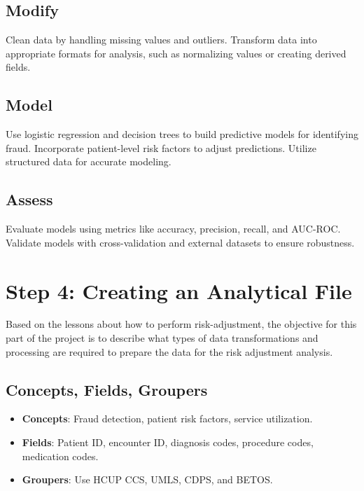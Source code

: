 \documentclass{article}
\begin{document}
\subsection*{Modify}
Clean data by handling missing values and outliers. Transform data into appropriate formats for analysis, such as normalizing values or creating derived fields.

\subsection*{Model}
Use logistic regression and decision trees to build predictive models for identifying fraud. Incorporate patient-level risk factors to adjust predictions. Utilize structured data for accurate modeling.

\subsection*{Assess}
Evaluate models using metrics like accuracy, precision, recall, and AUC-ROC. Validate models with cross-validation and external datasets to ensure robustness.

\section*{Step 4: Creating an Analytical File}

Based on the lessons about how to perform risk-adjustment, the objective for this part of the project is to describe what types of data transformations and processing are required to prepare the data for the risk adjustment analysis.

\subsection*{Concepts, Fields, Groupers}
\begin{itemize}
    \item \textbf{Concepts}: Fraud detection, patient risk factors, service utilization.
    \item \textbf{Fields}: Patient ID, encounter ID, diagnosis codes, procedure codes, medication codes.
    \item \textbf{Groupers}: Use HCUP CCS, UMLS, CDPS, and BETOS.
\end{itemize}
\end{document}
